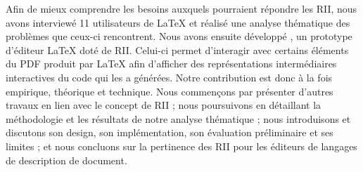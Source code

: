 Afin de mieux comprendre les besoins auxquels pourraient répondre les RII, nous avons interviewé 11 utilisateurs de \LaTeX{} et réalisé une analyse thématique des problèmes que ceux-ci rencontrent.
Nous avons ensuite développé \iLaTeX{}, un prototype d'éditeur \LaTeX{} doté de RII.
Celui-ci permet d'interagir avec certains éléments du PDF produit par \LaTeX{} afin d'afficher des représentations intermédiaires interactives du code qui les a générées.
Notre contribution est donc à la fois empirique, théorique et technique.
Nous commençons par présenter d'autres travaux en lien avec le concept de RII ;
nous poursuivons en détaillant la méthodologie et les résultats de notre analyse thématique ; nous introduisons \iLaTeX{} et discutons son design, son implémentation, son évaluation préliminaire et ses limites ;
et nous concluons sur la pertinence des RII pour les éditeurs de langages de description de document.